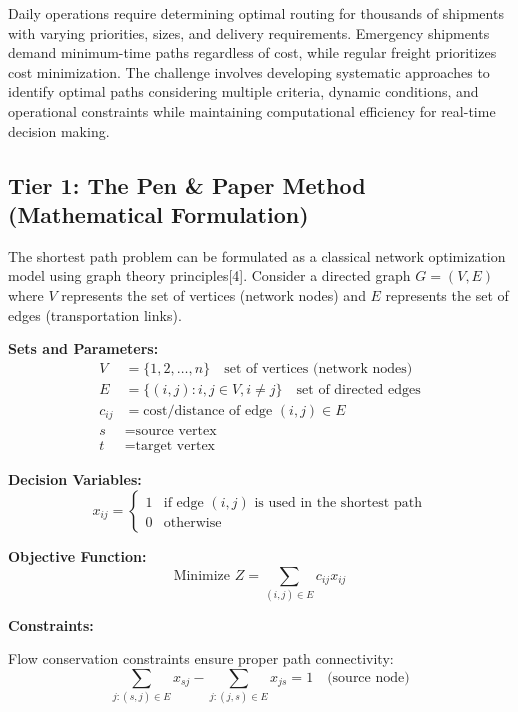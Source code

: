 \documentclass{article}
\begin{document}
Daily operations require determining optimal routing for thousands of shipments with varying priorities, sizes, and delivery requirements. Emergency shipments demand minimum-time paths regardless of cost, while regular freight prioritizes cost minimization. The challenge involves developing systematic approaches to identify optimal paths considering multiple criteria, dynamic conditions, and operational constraints while maintaining computational efficiency for real-time decision making.

\subsection{Tier 1: The Pen \& Paper Method (Mathematical Formulation)}

The shortest path problem can be formulated as a classical network optimization model using graph theory principles[4]. Consider a directed graph $G = (V, E)$ where $V$ represents the set of vertices (network nodes) and $E$ represents the set of edges (transportation links).

\textbf{Sets and Parameters:}
\begin{align}
V &= \{1, 2, \ldots, n\} \quad \text{set of vertices (network nodes)} \\
E &= \{(i,j) : i, j \in V, i \neq j\} \quad \text{set of directed edges} \\
c_{ij} &= \text{cost/distance of edge } (i,j) \in E \\
s &= \text{source vertex} \\
t &= \text{target vertex}
\end{align}

\textbf{Decision Variables:}
\begin{equation}
x_{ij} = \begin{cases}
1 & \text{if edge } (i,j) \text{ is used in the shortest path} \\
0 & \text{otherwise}
\end{cases}
\end{equation}

\textbf{Objective Function:}
\begin{equation}
\text{Minimize } Z = \sum_{(i,j) \in E} c_{ij} x_{ij}
\end{equation}

\textbf{Constraints:}

Flow conservation constraints ensure proper path connectivity:
\begin{equation}
\sum_{j:(s,j) \in E} x_{sj} - \sum_{j:(j,s) \in E} x_{js} = 1 \quad \text{(source node)}
\end{equation}
\end{document}
